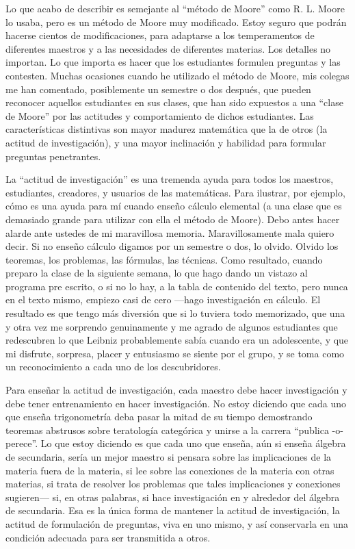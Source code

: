 \documentclass[12pt]{article}
\begin{document}
    Lo que acabo de describir es semejante al “método de Moore” como R. L. Moore lo usaba, pero es un método
    de Moore muy modificado.
    Estoy seguro que podrán hacerse cientos de modificaciones, para adaptarse a los
    temperamentos de diferentes maestros y a las necesidades de diferentes materias.
    Los detalles no importan.
    Lo que importa es hacer que los estudiantes formulen preguntas y las contesten.
    Muchas ocasiones cuando he
    utilizado el método de Moore, mis colegas me han comentado, posiblemente un semestre o dos después, que
    pueden reconocer aquellos estudiantes en sus clases, que han sido expuestos a una “clase de Moore” por las
    actitudes y comportamiento de dichos estudiantes.
    Las características distintivas son mayor madurez
    matemática que la de otros (la actitud de investigación), y una mayor inclinación y habilidad para formular
    preguntas penetrantes.

    La “actitud de investigación” es una tremenda ayuda para todos los maestros, estudiantes, creadores, y
    usuarios de las matemáticas.
    Para ilustrar, por ejemplo, cómo es una ayuda para mí cuando enseño cálculo
    elemental (a una clase que es demasiado grande para utilizar con ella el método de Moore).
    Debo antes hacer alarde ante ustedes de mi maravillosa memoria.
    Maravillosamente mala quiero decir.
    Si no enseño cálculo
    digamos por un semestre o dos, lo olvido.
    Olvido los teoremas, los problemas, las fórmulas, las técnicas.
    Como resultado, cuando preparo la clase de la siguiente semana, lo que hago dando un vistazo al programa
    pre escrito, o si no lo hay, a la tabla de contenido del texto, pero nunca en el texto mismo, empiezo casi de
    cero —hago investigación en cálculo.
    El resultado es que tengo más diversión que si lo tuviera todo
    memorizado, que una y otra vez me sorprendo genuinamente y me agrado de algunos estudiantes que
    redescubren lo que Leibniz probablemente sabía cuando era un adolescente, y que mi disfrute, sorpresa,
    placer y entusiasmo se siente por el grupo, y se toma como un reconocimiento a cada uno de los
    descubridores.

    Para enseñar la actitud de investigación, cada maestro debe hacer investigación y debe tener entrenamiento en
    hacer investigación.
    No estoy diciendo que cada uno que enseña trigonometría deba pasar la mitad de su tiempo demostrando teoremas
    abstrusos sobre teratología categórica y unirse a la carrera “publica -o- perece”.
    Lo que estoy diciendo es que cada uno que enseña, aún si enseña álgebra de secundaria, sería un mejor
    maestro si pensara sobre las implicaciones de la materia fuera de la materia, si lee sobre las conexiones de la
    materia con otras materias, si trata de resolver los problemas que tales implicaciones y conexiones sugieren—
    si, en otras palabras, si hace investigación en y alrededor del álgebra de secundaria.
    Esa es la única forma de mantener la actitud de investigación, la actitud de formulación de preguntas, viva en uno
    mismo, y así conservarla en una condición adecuada para ser transmitida a otros.
\end{document}
